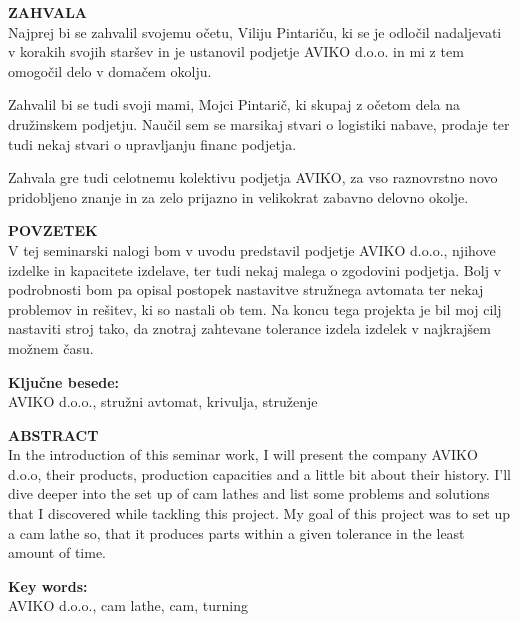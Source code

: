 \newpage
\textbf{\fontsize{14}{21}\selectfont ZAHVALA} \\
Najprej bi se zahvalil svojemu očetu, Viliju Pintariču,
ki se je odločil nadaljevati v korakih svojih staršev in 
je ustanovil podjetje AVIKO d.o.o. in mi z tem omogočil delo
v domačem okolju.

Zahvalil bi se tudi svoji mami, Mojci Pintarič, ki skupaj z očetom
dela na družinskem podjetju. Naučil sem se marsikaj stvari o 
logistiki nabave, prodaje ter tudi nekaj stvari o upravljanju
financ podjetja.

Zahvala gre tudi celotnemu kolektivu podjetja AVIKO, za vso
raznovrstno novo pridobljeno znanje in za zelo prijazno in velikokrat
zabavno delovno okolje.

\newpage
\textbf{\fontsize{14}{21}\selectfont POVZETEK} \\
V tej seminarski nalogi bom v uvodu predstavil podjetje AVIKO d.o.o.,
njihove izdelke in kapacitete izdelave, ter tudi nekaj malega
o zgodovini podjetja. Bolj v podrobnosti bom pa opisal
postopek nastavitve stružnega avtomata ter nekaj problemov in rešitev,
ki so nastali ob tem. Na koncu tega projekta je bil moj cilj
nastaviti stroj tako, da znotraj zahtevane tolerance izdela 
izdelek v najkrajšem možnem času.

\textbf{\fontsize{14}{21}\selectfont Ključne besede:} \\
\fontsize{12}{16}AVIKO d.o.o., stružni avtomat, krivulja, struženje

\newpage
\textbf{\fontsize{14}{21}\selectfont ABSTRACT} \\
In the introduction of this seminar work, I will present the 
company AVIKO d.o.o, their products, production capacities
and a little bit about their history. I'll dive deeper into the set up of 
cam lathes and list some problems and solutions that I discovered
while tackling this project. My goal of this project was to set up 
a cam lathe so, that it produces parts within a given tolerance 
in the least amount of time.

\textbf{\fontsize{14}{21}\selectfont Key words:} \\
AVIKO d.o.o., cam lathe, cam, turning